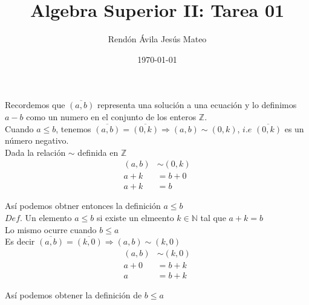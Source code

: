 \documentclass[12pt]{article}
\title{\textbf{Algebra Superior II: Tarea 01}}
\author{Rendón Ávila Jesús Mateo}
\date{\today}
\begin{document}
    Recordemos que $\overline{(a,b)}$ representa una solución a una ecuación y lo definimos $a - b$ como un numero en el conjunto de los enteros $\mathbb{Z}$.\\

    Cuando $a \leq b$, tenemos $\overline{(a,b)} = \overline{(0,k)} \Longrightarrow (a,b) \sim (0,k)$, $i.e$ $\overline{(0,k)}$ es un número negativo.\\

    Dada la relación $\sim$ definida en $\mathbb{Z}$
    \begin{align*}
        (a,b) &\sim (0,k)\\
        a + k &= b +0\\
        a + k &= b
    \end{align*}

    Así podemos obtner entonces la definición $a \leq b$\\

    $Def.$ Un elemento $a\leq b$ si existe un elmeento $k \in \mathbb{N}$ tal que $a + k = b$\\

    Lo mismo ocurre cuando $b \leq a$\\

    Es decir $\overline{(a,b)} = \overline{(k,0)} \Longrightarrow (a,b) \sim (k,0)$
    \begin{align*}
        (a,b) &\sim (k,0)\\
        a + 0 &= b + k\\
        a &= b + k
    \end{align*}

    Así podemos obtener la definición de $b \leq a$
\end{document}
